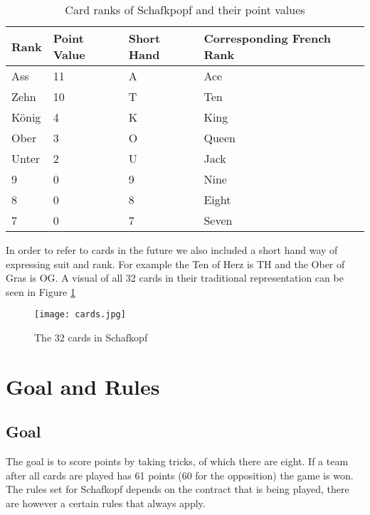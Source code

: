 \newline
\begin{table}[h!]
    \centering
    \begin{tabular}{llll}
        \toprule
        Rank  & Point Value & Short Hand & Corresponding French Rank \\
        \midrule
        Ass   & 11          & A          & Ace                       \\
        Zehn  & 10          & T          & Ten                       \\
        König & 4           & K          & King                      \\
        Ober  & 3           & O          & Queen                     \\
        Unter & 2           & U          & Jack                      \\
        9     & 0           & 9          & Nine                      \\
        8     & 0           & 8          & Eight                     \\
        7     & 0           & 7          & Seven                     \\
        \bottomrule
    \end{tabular}
    \caption{Card ranks of Schafkpopf and their point values}
    \label{tab:cardsvalues}
\end{table}
\newline
In order to refer to cards in the future we also included a short hand way of expressing suit and rank.
For example the Ten of Herz is TH and the Ober of Gras is OG.
A visual of all 32 cards in their traditional representation can be seen in Figure \ref{fig:32cards}
\begin{figure}[h!]
    \centering
    \texttt{[image: cards.jpg]}
    \caption{The 32 cards in Schafkopf}
    \label{fig:32cards}
\end{figure}
\section{Goal and Rules}

\subsection{Goal}
The goal is to score points by taking tricks, of which there are eight.
If a team after all cards are played has 61 points (60 for the opposition) the game is won.
The rules set for Schafkopf depends on the contract that is being played, there are however a certain rules that
always apply.

